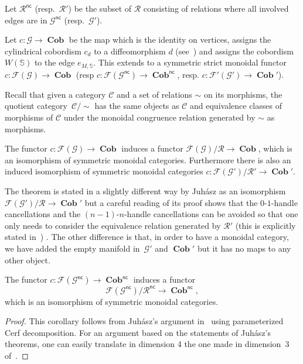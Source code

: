 \documentclass[pdftex]{sigma}
\numberwithin{equation}{section}
\numberwithin{theorem}{section}
\numberwithin{proposition}{section}
\numberwithin{definition}{section}
\numberwithin{lemma}{section}
\numberwithin{corollary}{section}
\numberwithin{remark}{section}
\numberwithin{example}{section}
\newcommand{\cat}{\mathcal{C}}
\newcommand{\cob}{\operatorname{\textbf{Cob}}}
\newcommand{\nc}[1]{{#1^{\mathsf{nc}}}}
\newcommand{\Sp}{\mathbb{S}}
\begin{document}
Let $\nc{\mathcal{R}}$ (resp.\ $\mathcal{R'}$) be the subset of
$\mathcal{R}$ consisting of relations where all involved edges are in
$\nc {\mathcal{G}}$ (resp.~$\mathcal{G'}$).
\begin{definition}
 Let $c\colon \mathcal{G}\to \cob$ be the map which is the identity on
 vertices, assigns the cylindrical cobordism $c_d$ to a
 diffeomorphism $d$ (see~\cite[Definition~2.3]{Juh2018}) and
 assigns the cobordism $W(\Sp)$ to the edge $ e_{M, \Sp}$. This
 extends to a symmetric strict monoidal functor
 $c\colon \mathcal{F}(\mathcal{G})\to \cob$ (resp
 $c\colon \mathcal{F}(\nc{\mathcal{G}})\to \nc{\cob}$,
 resp. $c\colon \mathcal{F'}({\mathcal{G'}})\to {\cob'}$).
\end{definition}

Recall that given a category $\cat$ and a set of relations $\sim$ on
its morphisms, the quotient category~$\cat/{\sim}$ has the same objects
as $\cat$ and
equivalence classes of morphisms of $\cat$
under the monoidal congruence relation generated by $\sim$
as morphisms.
\begin{theorem}
The functor $c\colon \mathcal{F}(\mathcal{G})\to \cob$ induces a functor
$\mathcal{F}(\mathcal{G})/\mathcal{R}\to \cob$,
which is an isomorphism of symmetric monoidal categories.
Furthermore there is also an induced isomorphism of symmetric monoidal categories
$c\colon \mathcal{F}(\mathcal{G'})/\mathcal{R'}\to \cob'$.
\end{theorem}

\begin{remark}
 The theorem is stated in a slightly different way by Juh\'asz as an
 isomorphism $\mathcal{F}(\mathcal{G'})/\mathcal{R}\to \cob'$ but a careful
 reading of its proof shows that the $0$-$1$-handle cancellations
 and the $(n-1)$-$n$-handle cancellations can be avoided so that one
 only needs to consider the equivalence relation generated by
 $\mathcal R'$ (this is explicitly stated in~\cite[Theorem~2.24]{Juh2018}) . The
 other difference is that, in order to have a monoidal category, we have added
 the empty manifold in~$\mathcal{G'}$ and $\cob'$ but it has no maps
 to any other object.
\end{remark}

\begin{corollary}
 The functor $c\colon \mathcal{F}(\nc{\mathcal{G}})\to \nc{\cob}$ induces
 a functor
 \[
 \mathcal{F}(\nc{\mathcal{G}})/\nc{\mathcal{R}}\to \nc\cob,
 \]
 which is an isomorphism of symmetric monoidal categories.
\end{corollary}
\begin{proof}
 This corollary follows from Juh\'asz's argument in~\cite{Juh2018}
 using parameterized Cerf decomposition. For an argument based on
 the statements of Juh\'asz's theorems, one can easily translate in
 dimension 4 the one made in dimension~3 of~\cite[Corollary~4.3]{CGPV2023a}.
\end{proof}
\end{document}
